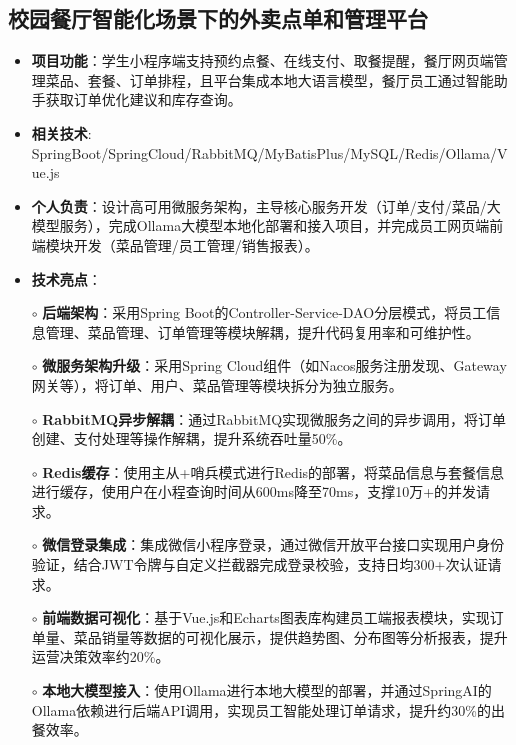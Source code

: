 \subsection{\textbf{校园餐厅智能化场景下的外卖点单和管理平台} \hspace{2cm}{2025.01 -- 2025.04}}
    \begin{normalsize}
      \begin{itemize}
        \item \textbf{项目功能}：学生小程序端支持预约点餐、在线支付、取餐提醒，餐厅网页端管理菜品、套餐、订单排程，且平台集成本地大语言模型，餐厅员工通过智能助手获取订单优化建议和库存查询。
        \item \textbf{相关技术}: SpringBoot/SpringCloud/RabbitMQ/MyBatisPlus/MySQL/Redis/Ollama/Vue.js
        \item \textbf{个人负责}：设计高可用微服务架构，主导核心服务开发（订单/支付/菜品/大模型服务），完成Ollama大模型本地化部署和接入项目，并完成员工网页端前端模块开发（菜品管理/员工管理/销售报表）。
        \item \textbf{技术亮点}：
        \setlength{\itemindent}{1em} %
          \item[$\circ$] \textbf{后端架构}：采用Spring Boot的Controller-Service-DAO分层模式，将员工信息管理、菜品管理、订单管理等模块解耦，提升代码复用率和可维护性。
          \item[$\circ$] \textbf{微服务架构升级}：采用Spring Cloud组件（如Nacos服务注册发现、Gateway网关等），将订单、用户、菜品管理等模块拆分为独立服务。
          \item[$\circ$] \textbf{RabbitMQ异步解耦​​}：通过RabbitMQ实现微服务之间的异步调用，将订单创建、支付处理等操作解耦，提升系统吞吐量50\%。
          \item[$\circ$] \textbf{Redis缓存}：使用主从+哨兵模式进行Redis的部署，将菜品信息与套餐信息进行缓存，使用户在小程查询时间从600ms降至70ms，支撑10万+的并发请求。
          \item[$\circ$] \textbf{微信登录集成}：集成微信小程序登录，通过微信开放平台接口实现用户身份验证，结合JWT令牌与自定义拦截器完成登录校验，支持日均300+次认证请求。
          \item[$\circ$] \textbf{前端数据可视化}：基于Vue.js和Echarts图表库构建员工端报表模块，实现订单量、菜品销量等数据的可视化展示，提供趋势图、分布图等分析报表，提升运营决策效率约20\%。
          \item[$\circ$] \textbf{本地大模型接入}：使用Ollama进行本地大模型的部署，并通过SpringAI的Ollama依赖进行后端API调用，实现员工智能处理订单请求，提升约30\%的出餐效率。
        \end{itemize}
    \end{normalsize}